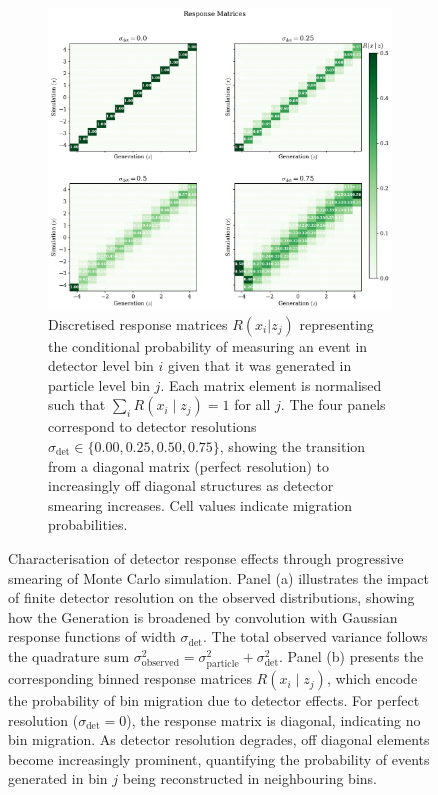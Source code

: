 \begin{figure}
\begin{subfigure}[t]{0.48\textwidth}
    \includegraphics[width=\textwidth]{figures/chapter-07/unbinned_cor-response_matrix.pdf}
    \caption{Discretised response matrices $R(x_i|z_j)$ representing the conditional probability of measuring an event in detector level bin $i$ given that it was generated in particle level bin $j$.
    Each matrix element is normalised such that $\sum_i R(x_i\mid z_j) = 1$ for all $j$.
    The four panels correspond to detector resolutions $\sigma_{\text{det}} \in \{0.00, 0.25, 0.50, 0.75\}$, showing the transition from a diagonal matrix (perfect resolution) to increasingly off diagonal structures as detector smearing increases. Cell values indicate migration probabilities.}
    \label{fig:response-matrices}
  \end{subfigure}
  \caption{Characterisation of detector response effects through progressive smearing of Monte Carlo simulation. Panel (a) illustrates the impact of finite detector resolution on the observed distributions, showing how the Generation is broadened by convolution with Gaussian response functions of width $\sigma_{\text{det}}$. The total observed variance follows the quadrature sum $\sigma^2_{\text{observed}} = \sigma^2_{\text{particle}} + \sigma^2_{\text{det}}$.
  Panel (b) presents the corresponding binned response matrices $R(x_i\mid z_j)$, which encode the probability of bin migration due to detector effects.
  For perfect resolution ($\sigma_{\text{det}} = 0$), the response matrix is diagonal, indicating no bin migration.
  As detector resolution degrades, off diagonal elements become increasingly prominent, quantifying the probability of events generated in bin $j$ being reconstructed in neighbouring bins.
  }
  \label{fig:smearing-and-response}
\end{figure}
